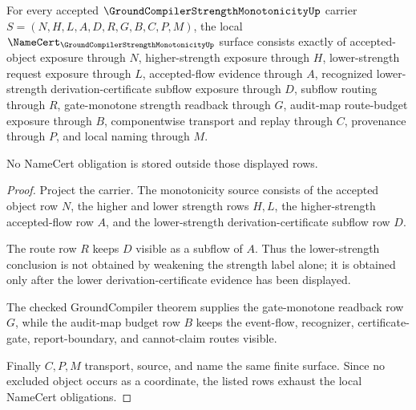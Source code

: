 \begin{theorem}
\label{thm:groundcompiler-strength-monotonicity-namecert-obligations}
For every accepted $\GroundCompilerStrengthMonotonicityUp$ carrier $S=(N,H,L,A,D,R,G,B,C,P,M)$, the local $\NameCert_{\GroundCompilerStrengthMonotonicityUp}$ surface consists exactly of accepted-object exposure through $N$, higher-strength exposure through $H$, lower-strength request exposure through $L$, accepted-flow evidence through $A$, recognized lower-strength derivation-certificate subflow exposure through $D$, subflow routing through $R$, gate-monotone strength readback through $G$, audit-map route-budget exposure through $B$, componentwise transport and replay through $C$, provenance through $P$, and local naming through $M$.

No NameCert obligation is stored outside those displayed rows.
\end{theorem}
\begin{proof}
Project the carrier. The monotonicity source consists of the accepted object row $N$, the higher and lower strength rows $H,L$, the higher-strength accepted-flow row $A$, and the lower-strength derivation-certificate subflow row $D$.

The route row $R$ keeps $D$ visible as a subflow of $A$. Thus the lower-strength conclusion is not obtained by weakening the strength label alone; it is obtained only after the lower derivation-certificate evidence has been displayed.

The checked GroundCompiler theorem supplies the gate-monotone readback row $G$, while the audit-map budget row $B$ keeps the event-flow, recognizer, certificate-gate, report-boundary, and cannot-claim routes visible.

Finally $C,P,M$ transport, source, and name the same finite surface. Since no excluded object occurs as a coordinate, the listed rows exhaust the local NameCert obligations.
\end{proof}

